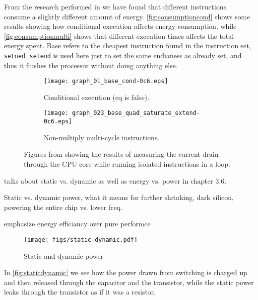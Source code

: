 From the research performed in \cite{rundehvatum2013exploring} we have found
that different instructions consume a slightly different amount of energy.
\autoref{fig:consumptioncond} shows some results showing how conditional
execution affects energy consumption, while \autoref{fig:consumptionmulti}
shows that different execution times affects the total energy spent. Base
refers to the cheapest instruction found in the instruction set, \texttt{setned}.
\texttt{setend} is used here just to set the same endianess as already set,
and thus it flushes the processor without doing anything else.


\begin{figure}
\begin{subfigure}[b]{0.48\textwidth}
\texttt{[image: graph\_01\_base\_cond-0c6.eps]}
\caption{Conditional execution (eq is false).}
\label{fig:consumptioncond}
\end{subfigure}
\begin{subfigure}[b]{0.52\textwidth}
\texttt{[image: graph\_023\_base\_quad\_saturate\_extend-0c6.eps]}
\caption{Non-multiply multi-cycle instructions.}
\label{fig:consumptionmulti}
\end{subfigure}
\caption{Figures from \cite{rundehvatum2013exploring} showing the results of measuring the
current drain through the CPU core while running isolated instructions in a loop.}
\label{fig:consumption}
\end{figure}

\cite{wolf} talks about static vs. dynamic as well as energy vs. power in chapter 3.6.

Static vs. dynamic power, what it means for further shrinking, dark silicon, powering
the entire chip vs. lower freq.

emphasize energy efficiancy over pure performce 

\begin{figure}
    \centering
    \texttt{[image: figs/static-dynamic.pdf]}
    \caption{Static and dynamic power}
    \label{fig:staticdynamic}
\end{figure}

In \autoref{fig:staticdynamic} we see how the power drawn from switching is charged up and then released
through the capacitor and the transistor, while the static power leaks through the transistor as if
it was a resistor.

